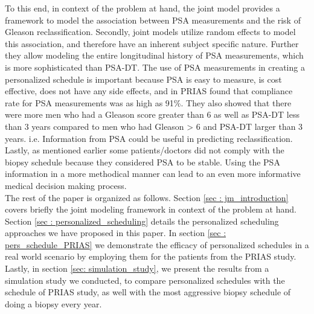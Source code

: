 To this end, in context of the problem at hand, the joint model provides a framework to model the association between PSA measurements and the risk of Gleason reclassification. Secondly, joint models utilize random effects to model this association, and therefore have an inherent subject specific nature. Further they allow modeling the entire longitudinal history of PSA measurements, which is more sophisticated than PSA-DT. The use of PSA measurements in creating a personalized schedule is important because PSA is easy to measure, is cost effective, does not have any side effects, and in PRIAS \cite{bokhorst2015compliance} found that compliance rate for PSA measurements was as high as 91\%. They also showed that there were more men who had a Gleason score greater than 6 as well as PSA-DT less than 3 years compared to men who had Gleason > 6 and PSA-DT larger than 3 years. i.e. Information from PSA could be useful in predicting reclassification. Lastly, as mentioned earlier some patients/doctors did not comply with the biopsy schedule because they considered PSA to be stable. Using the PSA information in a more methodical manner can lead to an even more informative medical decision making process.\\

The rest of the paper is organized as follows. Section \ref{sec : jm_introduction} covers briefly the joint modeling framework in context of the problem at hand. Section \ref{sec : personalized_scheduling} details the personalized scheduling approaches we have proposed in this paper. In section \ref{sec : pers_schedule_PRIAS} we demonstrate the efficacy of personalized schedules in a real world scenario by employing them for the patients from  the PRIAS study. Lastly, in section \ref{sec: simulation_study}, we present the results from a simulation study we conducted, to compare personalized schedules with the schedule of PRIAS study, as well with the most aggressive biopsy schedule of doing a biopsy every year.